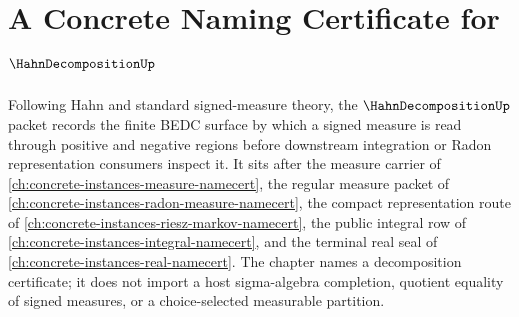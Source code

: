 \chapter{A Concrete Naming Certificate for $\HahnDecompositionUp$}
\label{ch:concrete-instances-hahn-decomposition-namecert}

Following Hahn and standard signed-measure theory, the $\HahnDecompositionUp$ packet records the finite BEDC surface by which a signed measure is read through positive and negative regions before downstream integration or Radon representation consumers inspect it. It sits after the measure carrier of \autoref{ch:concrete-instances-measure-namecert}, the regular measure packet of \autoref{ch:concrete-instances-radon-measure-namecert}, the compact representation route of \autoref{ch:concrete-instances-riesz-markov-namecert}, the public integral row of \autoref{ch:concrete-instances-integral-namecert}, and the terminal real seal of \autoref{ch:concrete-instances-real-namecert}. The chapter names a decomposition certificate; it does not import a host sigma-algebra completion, quotient equality of signed measures, or a choice-selected measurable partition.

